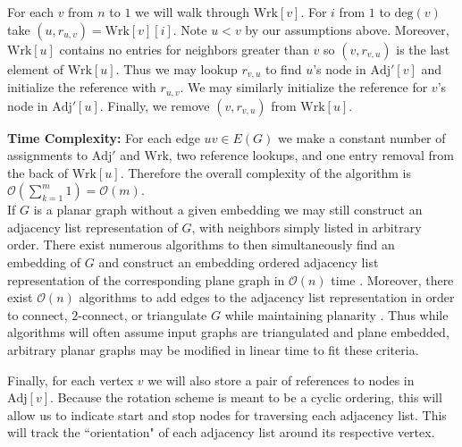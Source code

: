 \documentclass[letterpaper, 12pt]{amsart}
\theoremstyle{definition}
\theoremstyle{definition}
\theoremstyle{thm}
\theoremstyle{definition}
\begin{document}
For each $v$ from $n$ to $1$ we will walk through $\text{Wrk}[v]$. For $i$ from
$1$ to $\text{deg}(v)$ take $(u,r_{u,v})=\text{Wrk}[v][i]$. Note $u<v$ by our
assumptions above. Moreover, $\text{Wrk}[u]$ contains no entries for neighbors
greater than $v$ so $(v,r_{v,u})$ is the last element of $\text{Wrk}[u]$. Thus
we may lookup $r_{v,u}$ to find $u$'s node in $\text{Adj}'[v]$ and initialize the
reference with $r_{u,v}$. We may similarly initialize the reference for $v$'s
node in $\text{Adj}'[u]$. Finally, we remove $(v,r_{v,u})$ from $\text{Wrk}[u]$.

\noindent\textbf{Time Complexity:} For each edge $uv\in E(G)$ we make a constant
number of assignments to $\text{Adj}'$ and $\text{Wrk}$, two reference
lookups, and one entry removal from the back of $\text{Wrk}[u]$.
Therefore the overall complexity of the algorithm is
$\mathcal{O}\left(\sum_{k=1}^m 1\right)=\mathcal{O}(m)$.\\

If $G$ is a planar graph without a given embedding we may still construct an
adjacency list representation of $G$, with neighbors simply listed in arbitrary
order. There exist numerous algorithms to then simultaneously find an embedding
of $G$ and construct an embedding ordered adjacency list representation of the
corresponding plane graph in $\mathcal{O}(n)$ time \cite{tarjan, lempel, boyer,
booth}. Moreover, there exist $\mathcal{O}(n)$ algorithms to add edges
to the adjacency list representation in order to connect, $2$-connect, or
triangulate $G$ while maintaining planarity \cite{hagerup,reed,eswaran}. Thus while algorithms will
often assume input graphs are triangulated and plane embedded, arbitrary planar
graphs may be modified in linear time to fit these criteria.

Finally, for each vertex $v$ we will also store a pair of references to nodes in
$\text{Adj}[v]$. Because the rotation scheme is meant to be a cyclic ordering,
this will allow us to indicate start and stop nodes for traversing each adjacency
list. This will track the ``orientation" of each adjacency list around its
respective vertex.

\begin{comment}
If $G$ is a $2$-connected weakly triangulated graph with an outer cycle
$C=v_1v_2\ldots v_k$, vertices listed in clockwise order. We shall set the
the neighbor range of $v_i$ such that the start and indices are the indices of
$v_{i-1}$ and $v_{i+1}$ in $A[v_i]$, respectively. These indices are consider
in a cyclic manner, that is we consider $v_{0}=v_k$, $v_1=v_{k+1}$, and so on.
Many of the algorithms considered will work by removing one vertex at a time,
and considering the remaining graph using the maximal $2$-connected
subgraphs. If $v$ on the outer face, we may remove $v$ from $G$ by contracting
the neighbor ranges for its neighboring vertices on the outer face exclude $v$.
Interior neighbors will be If one of the
neighbors of $v$ is a cutvertex once $G$ is removed, we will split into two
\end{comment}
\end{document}

